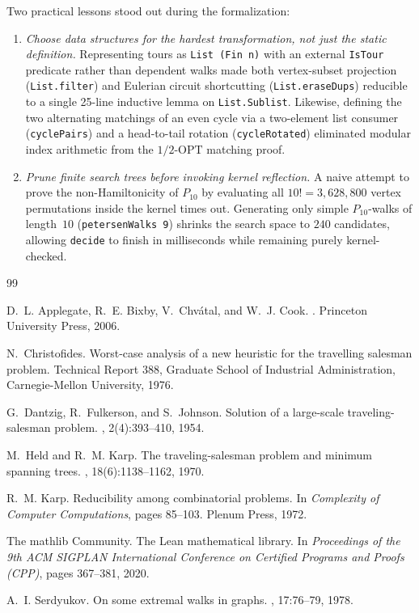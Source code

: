Two practical lessons stood out during the formalization:
\begin{enumerate}
  \item \emph{Choose data structures for the hardest transformation, not just the static definition.} Representing tours as \texttt{List (Fin n)} with an external \texttt{IsTour} predicate rather than dependent walks made both vertex-subset projection (\texttt{List.filter}) and Eulerian circuit shortcutting (\texttt{List.eraseDups}) reducible to a single 25-line inductive lemma on \texttt{List.Sublist}. Likewise, defining the two alternating matchings of an even cycle via a two-element list consumer (\texttt{cyclePairs}) and a head-to-tail rotation (\texttt{cycleRotated}) eliminated modular index arithmetic from the $1/2\text{-}\mathrm{OPT}$ matching proof.
  \item \emph{Prune finite search trees before invoking kernel reflection.} A naive attempt to prove the non-Hamiltonicity of $P_{10}$ by evaluating all $10! = 3{,}628{,}800$ vertex permutations inside the kernel times out. Generating only simple $P_{10}$-walks of length~$10$ (\texttt{petersenWalks 9}) shrinks the search space to $240$ candidates, allowing \texttt{decide} to finish in milliseconds while remaining purely kernel-checked.
\end{enumerate}

\begin{thebibliography}{99}

D.~L. Applegate, R.~E. Bixby, V.~Chv\'atal, and W.~J. Cook.
.
\newblock Princeton University Press, 2006.

N.~Christofides.
\newblock Worst-case analysis of a new heuristic for the travelling salesman problem.
\newblock Technical Report 388, Graduate School of Industrial Administration, Carnegie-Mellon University, 1976.

G.~Dantzig, R.~Fulkerson, and S.~Johnson.
\newblock Solution of a large-scale traveling-salesman problem.
, 2(4):393--410, 1954.

M.~Held and R.~M. Karp.
\newblock The traveling-salesman problem and minimum spanning trees.
, 18(6):1138--1162, 1970.

R.~M. Karp.
\newblock Reducibility among combinatorial problems.
\newblock In {\em Complexity of Computer Computations}, pages 85--103. Plenum Press, 1972.

The mathlib Community.
\newblock The Lean mathematical library.
\newblock In {\em Proceedings of the 9th ACM SIGPLAN International Conference on Certified Programs and Proofs (CPP)}, pages 367--381, 2020.

A.~I. Serdyukov.
\newblock On some extremal walks in graphs.
, 17:76--79, 1978.

\end{thebibliography}
